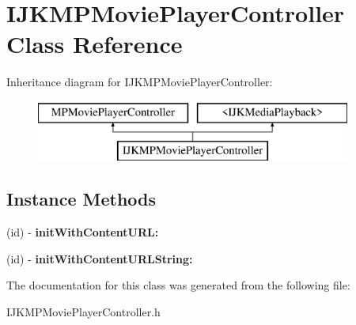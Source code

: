 \hypertarget{interface_i_j_k_m_p_movie_player_controller}{}\section{I\+J\+K\+M\+P\+Movie\+Player\+Controller Class Reference}
\label{interface_i_j_k_m_p_movie_player_controller}
Inheritance diagram for I\+J\+K\+M\+P\+Movie\+Player\+Controller\+:\begin{figure}[H]
\begin{center}
\leavevmode
\includegraphics[height=2.000000cm]{interface_i_j_k_m_p_movie_player_controller}
\end{center}
\end{figure}
\subsection*{Instance Methods}
\begin{DoxyCompactItemize}
\item 
\mbox{\label{interface_i_j_k_m_p_movie_player_controller_a6adcc4d43ff855cefc43a110b8f2511b}} 
(id) -\/ {\bfseries init\+With\+Content\+U\+R\+L\+:}
\item 
\mbox{\label{interface_i_j_k_m_p_movie_player_controller_a5a29cdfaea55d6fbab60bd392ed5a8d7}} 
(id) -\/ {\bfseries init\+With\+Content\+U\+R\+L\+String\+:}
\end{DoxyCompactItemize}


The documentation for this class was generated from the following file\+:\begin{DoxyCompactItemize}
\item 
I\+J\+K\+M\+P\+Movie\+Player\+Controller.\+h\end{DoxyCompactItemize}
